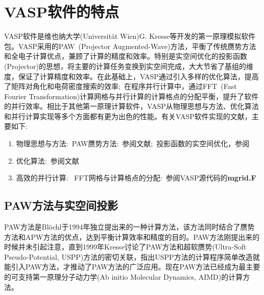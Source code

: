 \section{\rm{VASP}软件的特点}
\textrm{VASP}软件是维也纳大学(Universit\"at Wien)\textrm{G. Kresse}等开发的第一原理模拟软件包。\textrm{VASP}采用的\textrm{PAW~(Projector Augmented-Wave)}方法，平衡了传统赝势方法和全电子计算优点，兼顾了计算的精度和效率。特别是实空间优化的投影函数\textrm{(Projector)}的思想，将主要的计算任务变换到实空间完成，大大节省了基组的维度，保证了计算精度和效率。在此基础上，\textrm{VASP}通过引入多样的优化算法，提高了矩阵对角化和电荷密度搜索的效率;~在程序并行计算中，通过\textrm{FFT~(Fast Fourier Transformation)}计算网格与并行计算的计算格点的分配平衡，提升了软件的并行效率。相比于其他第一原理计算软件，\textrm{VASP}从物理思想与方法、优化算法和并行计算实现等多个方面都有更为出色的性能。有关\textrm{VASP}软件实现的文献，主要如下:~
\begin{enumerate}
	\item 物理思想与方法:~\textrm{PAW}赝势方法:~参阅文献\cite{PRB50-17953_1994,PRB59-1758_1999};~投影函数的实空间优化，参阅\cite{JPCM6-8245_1994,PRB44-13063_1991,PRB44-8503_1991}
	\item 优化算法:~参阅文献\cite{CMS6-15_1996,PRB54-11169_1996}
	\item 高效的并行计算:~ \textrm{FFT}网格与计算格点的分配:~参阅\textrm{VASP}源代码的\textbf{mgrid.F}
\end{enumerate}

\subsection{\rm{PAW}方法与实空间投影}
\textrm{PAW}方法是\textrm{Bl\"ochl}于1994年独立提出来的一种计算方法，该方法同时结合了赝势方法和APW方法的优点，达到平衡计算效率和精度的目的。\textrm{PAW}方法刚提出来的时候并未引起注意，直到1999年\textrm{Kresse}讨论了\textrm{PAW}方法和超软赝势\textrm{(Ultra-Soft Pseudo-Potential, USPP)}方法的密切关联，指出\textrm{USPP}方法的计算程序简单改造就能引入\textrm{PAW}方法，才推动了\textrm{PAW}方法的广泛应用。现在\textrm{PAW}方法已经成为最主要的可支持第一原理分子动力学\textrm{(Ab initio Molecular Dynamics, AIMD)}的计算方法。

